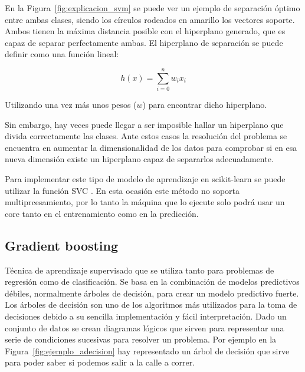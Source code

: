\documentclass[a4paper, 12pt]{book}
\begin{document}
En la Figura~\ref{fig:explicacion_svm} se puede ver un ejemplo de separación óptimo entre ambas clases, siendo los círculos rodeados en amarillo los vectores soporte. Ambos tienen la máxima distancia posible con el hiperplano generado, que es capaz de separar perfectamente ambas. El hiperplano de separación se puede definir como una función lineal:

\begin{equation}
    h(x) = \sum_{i= 0}^{n} w_i x_i
\end{equation}

Utilizando una vez más unos pesos ($w$) para encontrar dicho hiperplano.

Sin embargo, hay veces puede llegar a ser imposible hallar un hiperplano que divida correctamente las clases. Ante estos casos la resolución del problema se encuentra en aumentar la dimensionalidad de los datos para comprobar si en esa nueva dimensión existe un hiperplano capaz de separarlos adecuadamente.

Para implementar este tipo de modelo de aprendizaje en scikit-learn se puede utilizar la función SVC \cite{SVMDocumentation}. En esta ocasión este método no soporta multiprcesamiento, por lo tanto la máquina que lo ejecute solo podrá usar un core tanto en el entrenamiento como en la predicción.

\subsection{Gradient boosting}
\label{subsec:gradient_boosting}

Técnica de aprendizaje supervisado que se utiliza tanto para problemas de regresión como de clasificación. Se basa en la combinación de modelos predictivos débiles, normalmente árboles de decisión, para crear un modelo predictivo fuerte. Los árboles de decisión son uno de los algoritmos más utilizados para la toma de decisiones debido a su sencilla implementación y fácil interpretación. Dado un conjunto de datos se crean diagramas lógicos que sirven para representar una serie de condiciones sucesivas para resolver un problema. Por ejemplo en la Figura~\ref{fig:ejemplo_adecision} hay representado un árbol de decisión que sirve para poder saber si podemos salir a la calle a correr. 
\end{document}
